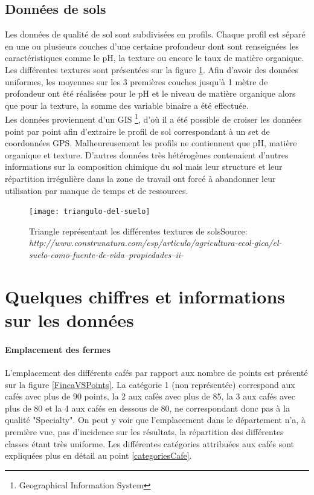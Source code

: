 \subsection{Données de sols} 
Les données de qualité de sol sont subdivisées en profils. Chaque profil est séparé en une ou plusieurs couches d’une certaine profondeur dont sont renseignées les caractéristiques comme le pH, la texture ou encore le taux de matière organique. Les différentes textures sont présentées sur la figure \ref{TriangleTexture}. Afin d'avoir des données uniformes, les moyennes sur les 3 premières couches jusqu'à 1 mètre de profondeur ont été réalisées pour le pH et le niveau de matière organique alors que pour la texture, la somme des variable binaire a été effectuée. \\


\noindent Les données proviennent d'un GIS \footnote{Geographical Information System}, d'où il a été possible de croiser les données point par point afin d'extraire le profil de sol correspondant à un set de coordonnées GPS. Malheureusement les profils ne contiennent que pH, matière organique et texture. D'autres données très hétérogènes contenaient d'autres informations sur la composition chimique du sol mais leur structure et leur répartition irrégulière dans la zone de travail ont forcé à abandonner leur utilisation par manque de temps et de ressources.

\begin{figure}[H]
	\centering
	\texttt{[image: triangulo-del-suelo]}
	\caption{\label{TriangleTexture} Triangle représentant les différentes textures de sols\newline Source: \textit{http://www.construnatura.com/esp/articulo/agricultura-ecol-gica/el-suelo-como-fuente-de-vida--propiedades--ii-}}
\end{figure}





\newpage
\section{Quelques chiffres et informations sur les données}

\paragraph{Emplacement des fermes}\label{EmpFermes} L'emplacement des différents cafés par rapport aux nombre de points est présenté sur la figure \ref{FincaVSPoints}. La catégorie 1 (non représentée) correspond aux cafés avec plus de 90 points, la 2 aux cafés avec plus de 85, la 3 aux cafés avec plus de 80 et la 4 aux cafés en dessous de 80, ne correspondant donc pas à la qualité "Specialty". On peut y voir que l'emplacement dans le département n'a, à première vue, pas d'incidence sur les résultats, la répartition des différentes classes étant très uniforme. Les différentes catégories attribuées aux cafés sont expliquées plus en détail au point \ref{categoriesCafe}.



